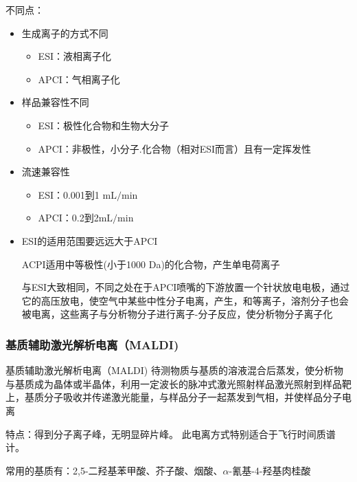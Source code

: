     不同点：
    \begin{itemize}
        \item 生成离子的方式不同
        \begin{itemize}
            \item ESI：液相离子化
            \item APCI：气相离子化
        \end{itemize}
        \item 样品兼容性不同
        \begin{itemize}
            \item ESI：极性化合物和生物大分子
            \item APCI：非极性，小分子.化合物（相对ESI而言）且有一定挥发性 
        \end{itemize}
        \item 流速兼容性
        \begin{itemize}
            \item ESI：0.001到1 $\mathrm{mL/min}$
            \item APCI：0.2到2$\mathrm{mL/min}$
        \end{itemize}
        \item ESI的适用范围要远远大于APCI
        
        ACPI适用中等极性(小于1000 Da)的化合物，产生单电荷离子

        与ESI大致相同，不同之处在于APCI喷嘴的下游放置一个针状放电电极，通过它的高压放电，使空气中某些中性分子电离，产生，和等离子，溶剂分子也会被电离，这些离子与分析物分子进行离子-分子反应，使分析物分子离子化
    \end{itemize}
    \subsubsection*{ 基质辅助激光解析电离（MALDI)}
    \begin{definition*}{基质辅助激光解析电离（MALDI)}
        待测物质与基质的溶液混合后蒸发，使分析物与基质成为晶体或半晶体，利用一定波长的脉冲式激光照射样品激光照射到样品靶上，基质分子吸收并传递激光能量，与样品分子一起蒸发到气相，并使样品分子电离
    \end{definition*}
    
    特点：得到分子离子峰，无明显碎片峰。 此电离方式特别适合于飞行时间质谱计。
    \begin{note}
        常用的基质有：2,5-二羟基苯甲酸、芥子酸、烟酸、$\alpha$-氰基-4-羟基肉桂酸
    \end{note}

